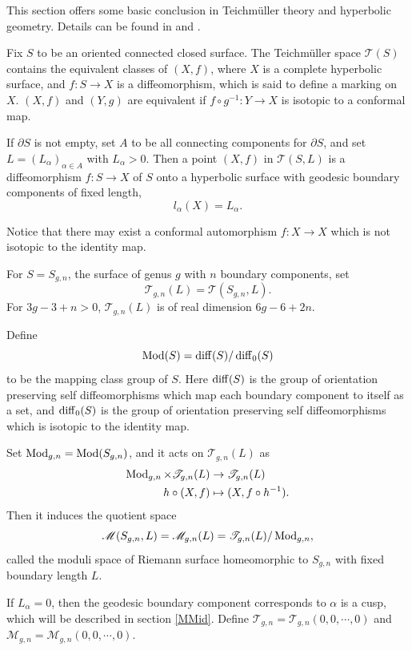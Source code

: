 This section offers some basic conclusion in  Teichm\"uller theory and hyperbolic geometry. Details can be found in \cite{Imayoshi1992An} and \cite{Buser}.

Fix $S$ to  be  an oriented  connected closed surface. The Teichm\"uller space $\mathscr{T}(S)$ contains the equivalent classes of $(X,f)$, where $X$ is a complete hyperbolic surface, and $f \colon S\to X$ is a diffeomorphism, which is said to define a marking on $X$. $(X,f)$ and $(Y,g)$ are equivalent if $f\circ g^{-1} \colon Y\to X$ is isotopic to a conformal map. 

If $\partial S$ is not empty, set $A$ to be all connecting components for $\partial S$, and set $L=(L_\alpha)_{\alpha\in A}$ with $L_\alpha>0$. Then a point $(X,f)$ in $\mathscr{T}(S,L)$  is a diffeomorphism $f \colon S\to X$ of $S$ onto a hyperbolic surface with geodesic boundary components of fixed length,
$$l_{\alpha}(X)=L_\alpha.$$ 

Notice that there may exist a conformal automorphism  $f \colon X\to X$ which is not isotopic to the identity map.
 
For  $S=S_{g,n}$, the surface of genus $g$ with $n$  boundary components, set 
$$
\mathscr{T}_{g,n}(L)=\mathscr{T}(S_{g,n},L).
$$
For $3g-3+n>0$, $\mathscr{T}_{g,n}(L)$ is of real dimension $6g-6+2n$.

Define 
$$\operatorname{Mod}(S)=\operatorname{diff}(S)/\operatorname{diff}_0(S)$$ 
to be  the mapping class group of $S$.  Here $\operatorname{diff}(S)$ is the group of  orientation preserving self diffeomorphisms which  map each boundary component to itself as a set,  and $\operatorname{diff}_0(S)$ is the group of  orientation preserving self diffeomorphisms which is isotopic to the identity map.

Set $\operatorname{Mod}_{g,n}=\operatorname{Mod}(S_{g,n})$, and it acts on $\mathscr{T}_{g,n}(L)$ as 
$$
\begin{aligned}
    \operatorname{Mod}_{g,n}\times \mathscr{T}_{g,n}(L)&\to \mathscr{T}_{g,n}(L)\\
    h\circ  (X,f)&\mapsto (X,f\circ h^{-1}).\\
\end{aligned}
$$
Then it induces the  quotient space $$
\mathscr{M}(S_{g,n},L)=\mathscr{M}_{g,n}(L) =\mathscr{T}_{g,n}(L)/\operatorname{Mod}_{g,n},
$$
called the moduli space  of Riemann surface homeomorphic to $S_{g,n}$  with fixed  boundary length $L$.

If $L_\alpha=0$, then the geodesic boundary component corresponds to $\alpha$ is a cusp,  which will be described in section \ref{MMid}. Define $\mathscr{T}_{g,n}=\mathscr{T}_{g,n}(0,0,\cdots,0)$ and $\mathscr{M}_{g,n}=\mathscr{M}_{g,n}(0,0,\cdots,0)$.


